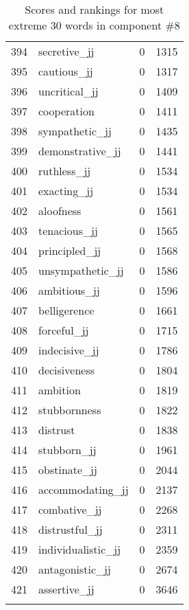 \begin{longtable}[!htbp]{| rlr@{.}l |}
    394 & secretive\_jj & 0 & 1315 \\
    395 & cautious\_jj & 0 & 1317 \\
    396 & uncritical\_jj & 0 & 1409 \\
    397 & cooperation & 0 & 1411 \\
    398 & sympathetic\_jj & 0 & 1435 \\
    399 & demonstrative\_jj & 0 & 1441 \\
    400 & ruthless\_jj & 0 & 1534 \\
    401 & exacting\_jj & 0 & 1534 \\
    402 & aloofness & 0 & 1561 \\
    403 & tenacious\_jj & 0 & 1565 \\
    404 & principled\_jj & 0 & 1568 \\
    405 & unsympathetic\_jj & 0 & 1586 \\
    406 & ambitious\_jj & 0 & 1596 \\
    407 & belligerence & 0 & 1661 \\
    408 & forceful\_jj & 0 & 1715 \\
    409 & indecisive\_jj & 0 & 1786 \\
    410 & decisiveness & 0 & 1804 \\
    411 & ambition & 0 & 1819 \\
    412 & stubbornness & 0 & 1822 \\
    413 & distrust & 0 & 1838 \\
    414 & stubborn\_jj & 0 & 1961 \\
    415 & obstinate\_jj & 0 & 2044 \\
    416 & accommodating\_jj & 0 & 2137 \\
    417 & combative\_jj & 0 & 2268 \\
    418 & distrustful\_jj & 0 & 2311 \\
    419 & individualistic\_jj & 0 & 2359 \\
    420 & antagonistic\_jj & 0 & 2674 \\
    421 & assertive\_jj & 0 & 3646 \\
    \hline
    \caption{Scores and rankings for most extreme 30 words in component \#8} \\
\end{longtable}

